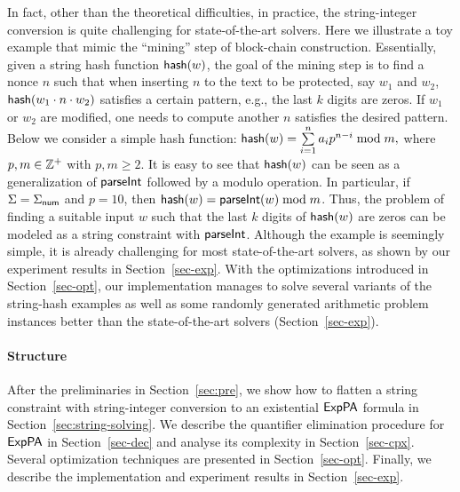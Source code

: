 In fact, other than the theoretical difficulties, in practice, the string-integer conversion is quite challenging for state-of-the-art solvers. 
Here we illustrate a toy example that mimic the ``mining'' step of block-chain construction. 
Essentially, given a string hash function ${\sf hash}(w)$, the goal of the mining step is to find a nonce $n$ such that when inserting $n$ to the text to be protected, say $w_1$ and $w_2$, ${\sf hash}(w_1\cdot n\cdot w_2)$ satisfies a certain pattern, e.g., the last $k$ digits are zeros. 
If $w_1$ or $w_2$ are modified, one needs to compute another $n$ satisfies the desired pattern.
Below we consider a simple hash function:
${\sf hash}(w) = \sum \limits_{i = 1}^n a_i p^{n-i} \bmod m,$
where $p, m \in \mathbb{Z}^+$ with $p, m \ge 2$. 
It is easy to see that ${\sf hash}(w)$ can be seen as a generalization of $\textsf{parseInt}$ followed by a modulo operation. 
In particular, if $\Sigma = \Sigma_{\sf num}$ and $p = 10$, then ${\sf hash}(w) = \textsf{parseInt}(w) \bmod m$. Thus, the problem of finding a suitable input $w$ such that the last $k$ digits of ${\sf hash}(w)$ are zeros can be modeled as a string constraint with $\textsf{parseInt}$. Although the example is seemingly simple, it is already challenging for most state-of-the-art solvers, as shown by our experiment results in Section~\ref{sec-exp}. 
With the optimizations introduced in Section~\ref{sec-opt}, 
our implementation manages to solve several variants of the string-hash examples as well as some randomly generated arithmetic problem instances better than the state-of-the-art solvers (Section~\ref{sec-exp}). 
 
\paragraph*{Structure}
After the preliminaries in Section~\ref{sec:pre}, we show how to flatten a string constraint with string-integer conversion to an existential ${\sf ExpPA}$ formula in Section~\ref{sec:string-solving}. We describe the quantifier elimination procedure for ${\sf ExpPA}$ in Section~\ref{sec-dec} and analyse its complexity in Section~\ref{sec-cpx}. Several optimization techniques are presented in Section~\ref{sec-opt}. Finally, we describe the implementation and experiment results in Section~\ref{sec-exp}.


